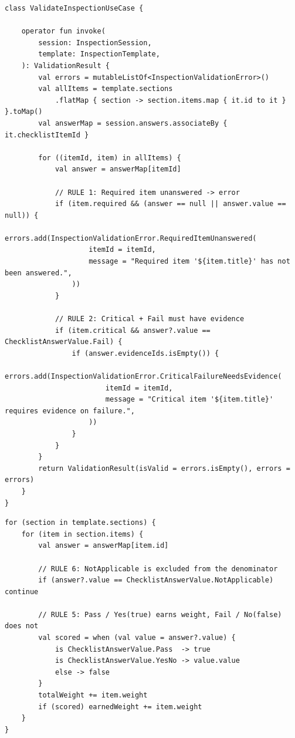\documentclass[11pt,a4paper]{article}
\newcommand{\file}[1]{{\small\texttt{#1}}}
\begin{document}
\begin{lstlisting}[caption={\file{domain/.../usecase/ValidateInspectionUseCase.kt}
--- a pure function over two domain models. No repository, no coroutine, no
Android. This is the easiest kind of code to test and the hardest kind to break
accidentally.}]
class ValidateInspectionUseCase {

    operator fun invoke(
        session: InspectionSession,
        template: InspectionTemplate,
    ): ValidationResult {
        val errors = mutableListOf<InspectionValidationError>()
        val allItems = template.sections
            .flatMap { section -> section.items.map { it.id to it } }.toMap()
        val answerMap = session.answers.associateBy { it.checklistItemId }

        for ((itemId, item) in allItems) {
            val answer = answerMap[itemId]

            // RULE 1: Required item unanswered -> error
            if (item.required && (answer == null || answer.value == null)) {
                errors.add(InspectionValidationError.RequiredItemUnanswered(
                    itemId = itemId,
                    message = "Required item '${item.title}' has not been answered.",
                ))
            }

            // RULE 2: Critical + Fail must have evidence
            if (item.critical && answer?.value == ChecklistAnswerValue.Fail) {
                if (answer.evidenceIds.isEmpty()) {
                    errors.add(InspectionValidationError.CriticalFailureNeedsEvidence(
                        itemId = itemId,
                        message = "Critical item '${item.title}' requires evidence on failure.",
                    ))
                }
            }
        }
        return ValidationResult(isValid = errors.isEmpty(), errors = errors)
    }
}
\end{lstlisting}

\begin{lstlisting}[caption={\file{domain/.../usecase/CalculateInspectionScoreUseCase.kt}
--- weighted scoring with \texttt{NotApplicable} excluded from the denominator.
Expressing this in SQL inside a DAO would hide a business decision inside an
infrastructure detail.}]
for (section in template.sections) {
    for (item in section.items) {
        val answer = answerMap[item.id]

        // RULE 6: NotApplicable is excluded from the denominator
        if (answer?.value == ChecklistAnswerValue.NotApplicable) continue

        // RULE 5: Pass / Yes(true) earns weight, Fail / No(false) does not
        val scored = when (val value = answer?.value) {
            is ChecklistAnswerValue.Pass  -> true
            is ChecklistAnswerValue.YesNo -> value.value
            else -> false
        }
        totalWeight += item.weight
        if (scored) earnedWeight += item.weight
    }
}
\end{lstlisting}
\end{document}
